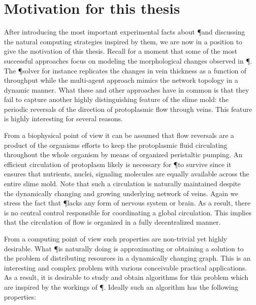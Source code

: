 \section{Motivation for this thesis}

	After introducing the most important experimental facts about \P and discussing the natural computing strategies inspired by them, we are now in a position to give the motivation of this thesis. Recall for a moment that some of the most successful approaches focus on modeling the morphological changes observed in \P. The \P solver for instance replicates the changes in vein thickness as a function of throughput while the multi-agent approach mimics the network topology in a dynamic manner. What these and other approaches have in common is that they fail to capture another highly distinguishing feature of the slime mold: the periodic reversals of the direction of protoplasmic flow through veins. This feature is highly interesting for several reasons. 

	From a biophysical point of view it can be assumed that flow reversals are a product of the organisms efforts to keep the protoplasmic fluid circulating throughout the whole organism by means of organized peristaltic pumping. An efficient circulation of protoplasm likely is necessary for \P to survive since it ensures that nutrients, nuclei, signaling molecules \etc are equally available across the entire slime mold. Note that such a circulation is naturally maintained despite the dynamically changing and growing underlying network of veins. Again we stress the fact that \P lacks any form of nervous system or brain. As a result, there is no central control responsible for coordinating a global circulation. This implies that the circulation of flow is organized in a fully decentralized manner.

	From a computing point of view such properties are non-trivial yet highly desirable. What \P is naturally doing is approximating or obtaining a solution to the problem of distributing resources in a dynamically changing graph. This is an interesting and complex problem with various conceivable practical applications. As a result, it is desirable to study and obtain algorithms for this problem which are inspired by the workings of \P. Ideally such an algorithm has the following properties:

